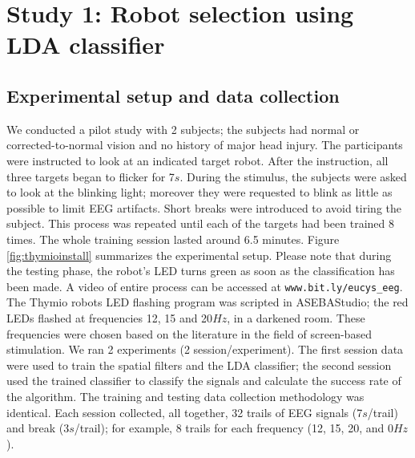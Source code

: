 \documentclass{svmult}
\begin{document}
\section{Study 1: Robot selection using LDA classifier}
\label{sec:ML_approach}

\subsection{Experimental setup and data collection}
We conducted a pilot study with 2 subjects; the subjects had normal or corrected-to-normal vision and no history of major head injury. The participants were instructed to look at an indicated target robot. After the instruction, all three targets began to flicker for 7$s$. During the stimulus, the subjects were asked to look at the blinking light; moreover they were requested to blink as little as possible to limit EEG artifacts. Short breaks were introduced to avoid tiring the subject. This process was repeated until each of the targets had been trained 8 times. The whole training session lasted around 6.5 minutes. Figure \ref{fig:thymioinstall} summarizes the experimental setup. Please note that during the testing phase, the robot's LED turns green as soon as the classification has been made. A video of entire process can be accessed at \verb"www.bit.ly/eucys_eeg". The Thymio robots LED flashing program was scripted in ASEBAStudio; the red LEDs flashed at frequencies 12, 15 and 20$Hz$, in a darkened room. These frequencies were chosen based on the literature in the field of screen-based stimulation. We ran 2 experiments (2 session/experiment). The first session data were used to train the spatial filters and the LDA classifier; the second session used the trained classifier to classify the signals and calculate the success rate of the algorithm. The training and testing data collection methodology was identical. Each session collected, all together, 32 trails of EEG signals (7$s$/trail) and break (3$s$/trail); for example, 8 trails for each frequency (12, 15, 20, and 0$Hz$). 
\end{document}
